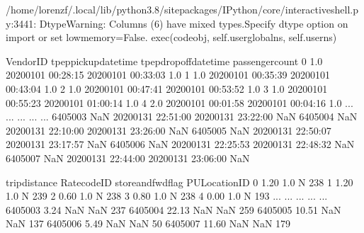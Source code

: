 \documentclass[letterpaper,10pt,english]{jupyterBook}
\begin{document}
\begin{sphinxVerbatim}[commandchars=\\\{\}]
/home/lorenzf/.local/lib/python3.8/site\PYGZhy{}packages/IPython/core/interactiveshell.py:3441: DtypeWarning: Columns (6) have mixed types.Specify dtype option on import or set low\PYGZus{}memory=False.
  exec(code\PYGZus{}obj, self.user\PYGZus{}global\PYGZus{}ns, self.user\PYGZus{}ns)
\end{sphinxVerbatim}

\begin{sphinxVerbatim}[commandchars=\\\{\}]
\end{sphinxVerbatim}

\begin{sphinxVerbatim}[commandchars=\\\{\}]
         VendorID tpep\PYGZus{}pickup\PYGZus{}datetime tpep\PYGZus{}dropoff\PYGZus{}datetime  passenger\PYGZus{}count  \PYGZbs{}
0             1.0  2020\PYGZhy{}01\PYGZhy{}01 00:28:15   2020\PYGZhy{}01\PYGZhy{}01 00:33:03              1.0   
1             1.0  2020\PYGZhy{}01\PYGZhy{}01 00:35:39   2020\PYGZhy{}01\PYGZhy{}01 00:43:04              1.0   
2             1.0  2020\PYGZhy{}01\PYGZhy{}01 00:47:41   2020\PYGZhy{}01\PYGZhy{}01 00:53:52              1.0   
3             1.0  2020\PYGZhy{}01\PYGZhy{}01 00:55:23   2020\PYGZhy{}01\PYGZhy{}01 01:00:14              1.0   
4             2.0  2020\PYGZhy{}01\PYGZhy{}01 00:01:58   2020\PYGZhy{}01\PYGZhy{}01 00:04:16              1.0   
...           ...                  ...                   ...              ...   
6405003       NaN  2020\PYGZhy{}01\PYGZhy{}31 22:51:00   2020\PYGZhy{}01\PYGZhy{}31 23:22:00              NaN   
6405004       NaN  2020\PYGZhy{}01\PYGZhy{}31 22:10:00   2020\PYGZhy{}01\PYGZhy{}31 23:26:00              NaN   
6405005       NaN  2020\PYGZhy{}01\PYGZhy{}31 22:50:07   2020\PYGZhy{}01\PYGZhy{}31 23:17:57              NaN   
6405006       NaN  2020\PYGZhy{}01\PYGZhy{}31 22:25:53   2020\PYGZhy{}01\PYGZhy{}31 22:48:32              NaN   
6405007       NaN  2020\PYGZhy{}01\PYGZhy{}31 22:44:00   2020\PYGZhy{}01\PYGZhy{}31 23:06:00              NaN   

         trip\PYGZus{}distance  RatecodeID store\PYGZus{}and\PYGZus{}fwd\PYGZus{}flag  PULocationID  \PYGZbs{}
0                 1.20         1.0                  N           238   
1                 1.20         1.0                  N           239   
2                 0.60         1.0                  N           238   
3                 0.80         1.0                  N           238   
4                 0.00         1.0                  N           193   
...                ...         ...                ...           ...   
6405003           3.24         NaN                NaN           237   
6405004          22.13         NaN                NaN           259   
6405005          10.51         NaN                NaN           137   
6405006           5.49         NaN                NaN            50   
6405007          11.60         NaN                NaN           179   


\end{sphinxVerbatim}
\end{document}
